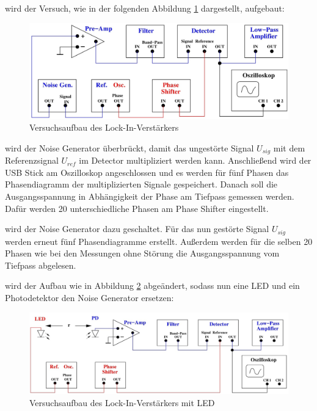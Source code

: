 \justifying wird der Versuch, wie in der folgenden Abbildung \ref{fig:1} dargestellt, aufgebaut: 

\begin{figure}[H]
    \centering
    \includegraphics[width=\linewidth]{./images/lock-in.jpg}
    \caption{Versuchsaufbau des Lock-In-Verstärkers \cite{V303}}
    \label{fig:1}
\end{figure}

\justifying wird der Noise Generator überbrückt, damit das ungestörte Signal $U_{sig}$ mit dem Referenzsignal $U_{ref}$
im Detector multipliziert werden kann. Anschließend wird der USB Stick am Oszilloskop angeschlossen und es werden für fünf Phasen das Phasendiagramm 
der multiplizierten Signale gespeichert. Danach soll die Ausgangsspannung in Abhängigkeit der Phase am Tiefpass gemessen werden. Dafür werden 
20 unterschiedliche Phasen am Phase Shifter eingestellt. 

\justifying wird der Noise Generator dazu geschaltet. Für das nun gestörte Signal $U_{sig}$ werden erneut fünf Phasendiagramme
erstellt. Außerdem werden für die selben 20 Phasen wie bei den Messungen ohne Störung die Ausgangsspannung vom Tiefpass abgelesen. 

\justifying wird der Aufbau wie in Abbildung \ref{fig:2} abgeändert, sodass nun eine LED und ein Photodetektor den 
Noise Generator ersetzen:

\begin{figure}[H]
    \centering
    \includegraphics[width=\linewidth]{./images/lock-in_led.jpg}
    \caption{Versuchsaufbau des Lock-In-Verstärkers mit LED \cite{V303}}
    \label{fig:2}
\end{figure}

